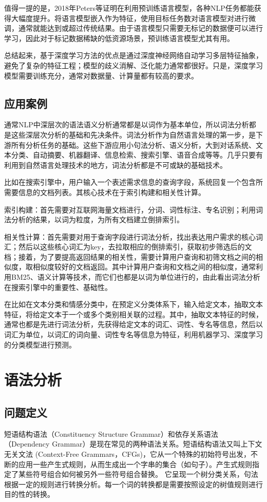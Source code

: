 值得一提的是，2018年Peters等证明在利用预训练语言模型\cite{conneau2017supervised}\cite{mccann2017learned}\cite{subramanian2018learning}，各种NLP任务都能获得大幅度提升。将语言模型嵌入作为特征，使用目标任务数对语言模型对进行微调\cite{ramachandran2016unsupervised}\cite{howard2018universal}，通常就能达到或超过传统结果。由于语言模型只需要无标记的数据便可以进行学习，因此对于标记数据稀缺的低资源场景，预训练语言模型尤其有用。

总结起来，基于深度学习方法的优点是通过深度神经网络自动学习多层特征抽象，避免了复杂的特征工程；模型的歧义消解、泛化能力通常都很好。只是，深度学习模型需要训练充分，通常对数据量、计算量都有较高的要求。

\subsection{应用案例}
通常NLP中深层次的语法语义分析通常都是以词作为基本单位，所以词法分析都是这些深层次分析的基础和先决条件。词法分析作为自然语言处理的第一步，是下游所有分析任务的基础。这些下游应用小句法分析、语义分析，大到对话系统、文本分类、自动摘要、机器翻译\cite{chang2008optimizing}、信息检索、搜索引擎、语音合成等等。几乎只要有利用到自然语言处理技术的地方，词法分析都是不可或缺的基础技术。

比如在搜索引擎中，用户输入一个表述需求信息的查询字段，系统回复一个包含所需要信息的文档列表。其核心技术在于索引构建和相关性计算。

索引构建：首先需要对互联网海量文档进行，分词、词性标注、专名识别；利用词法分析的结果，以词为粒度，为所有文档建立倒排索引。

相关性计算：首先需要对用于查询字段进行词法分析，找出表达用户需求的核心词汇；然后以这些核心词汇为key，去拉取相应的倒排索引，获取初步筛选后的文档；接着，为了要提高返回结果的相关性，需要计算用户查询和初筛文档之间的相似度，取相似度较好的文档返回。其中计算用户查询和文档之间的相似度，通常利用BM25、语义计算等技术，而它们也都是以词为单位进行的，由此看出词法分析在搜索引擎中的重要性、基础性。

在比如在文本分类和情感分类中，在预定义分类体系下，输入给定文本，抽取文本特征，将给定文本于一个或多个类别相关联的过程。其中，抽取文本特征的时候，通常也都是先进行词法分析，先获得给定文本的词汇、词性、专名等信息，然后以词汇为单位，以词汇的词向量、词性专名等信息为特征，利用机器学习、深度学习的分类模型进行预测。


\section{语法分析}
\subsection{问题定义}
短语结构语法（Constituency Structure Grammar）和依存关系语法（Dependency Grammar）是现在常见的两种语法关系。短语结构语法又叫上下文无关文法 (Context-Free Grammars，CFGs)，它从一个特殊的初始符号出发，不断的应用一些产生式规则，从而生成出一个字串的集合（如句子）。产生式规则指定了某些符号组合如何被另外一些符号组合替换。
它呈现一个树分类关系，句法根据一定的规则进行转换分析。每一个词的转换都是需要按照设定的树值规则进行目的性的转换。

